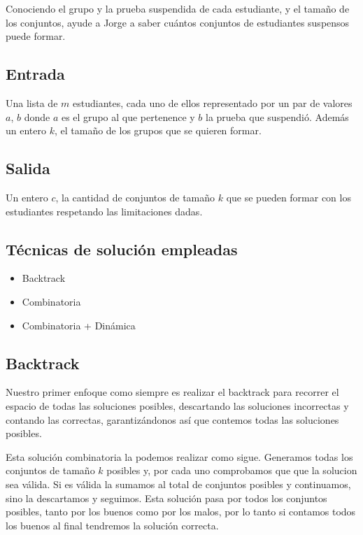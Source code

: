 \documentclass{article}
\begin{document}
Conociendo el grupo y la prueba suspendida de cada estudiante, y el tamaño de los conjuntos, ayude a Jorge a saber cuántos conjuntos de estudiantes suspensos puede formar.

\subsection{Entrada}

Una lista de $m$ estudiantes, cada uno de ellos representado por un par de valores $a$, $b$ donde $a$ es el grupo al que pertenence y $b$ la prueba que suspendió. Además un entero $k$, el tamaño de los grupos que se quieren formar.

\subsection{Salida}

Un entero $c$, la cantidad de conjuntos de tamaño $k$ que se pueden formar con los estudiantes respetando las limitaciones dadas.

\subsection{Técnicas de solución empleadas}

\begin{itemize}
\item Backtrack
\item Combinatoria
\item Combinatoria + Dinámica
\end{itemize}

\subsection{Backtrack}

Nuestro primer enfoque como siempre es realizar el backtrack para recorrer el espacio de todas las soluciones posibles, descartando las soluciones incorrectas y contando las correctas, garantizándonos así que contemos todas las soluciones posibles.

Esta solución combinatoria la podemos realizar como sigue. Generamos todas los conjuntos de tamaño $k$ posibles y, por cada uno comprobamos que que la solucion sea válida. Si es válida la sumamos al total de conjuntos posibles y continuamos, sino la descartamos y seguimos. Esta solución pasa por todos los conjuntos posibles, tanto por los buenos como por los malos, por lo tanto si contamos todos los buenos al final tendremos la solución correcta.
\end{document}

